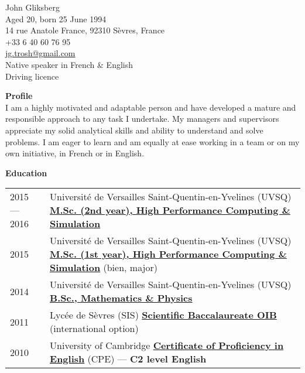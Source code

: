\documentclass[pdftex,a4paper,10pt]{article}
\begin{document}

{\Large John Gliksberg}
\hrulefill\\
\newline
Aged 20, born 25 June 1994\\
14 rue Anatole France, 92310 Sèvres, France\\[.1cm]
+33 6 40 60 76 95\\
\href{mailto:jg.trosh@gmail.com}
{jg.trosh\makeatletter @\makeatother gmail.com}\\[.1cm]
Native speaker in French \& English\\
Driving licence

\begin{center}
\end{center}
\vspace{.3cm}

{\large\bf Profile}
\hrulefill\\[.3cm]
{\setlength{\extrarowheight}{.2cm}
I am a highly motivated and adaptable person and have developed
a mature and responsible approach to any task I undertake.
My managers and supervisors appreciate my solid analytical skills
and ability to understand and solve problems.
I am eager to learn and am equally at ease working in a team
or on my own initiative, in French or in English.
}
\vspace{.3cm}

{\large\bf Education}
\hrulefill\\[.3cm]
{\setlength{\extrarowheight}{.2cm}
\begin{tabularx}{\textwidth}{lX}
2015 \---- 2016 &
Université de Versailles Saint-Quentin-en-Yvelines (UVSQ)
\newline
\href{http://mihps.prism.uvsq.fr}
{\bf M.Sc. (2nd year), High Performance Computing \& Simulation}\\
2015 &
Université de Versailles Saint-Quentin-en-Yvelines (UVSQ)
\newline
\href{http://mihps.prism.uvsq.fr}
{\bf M.Sc. (1st year), High Performance Computing \& Simulation}
(bien, major)\\
2014 &
Université de Versailles Saint-Quentin-en-Yvelines (UVSQ)
\newline
\href{http://www.uvsq.fr/double-licence-mathematiques-et-physique-343617.kjsp}
{\bf B.Sc., Mathematics \& Physics}\\
2011 &
Lycée de Sèvres (SIS)
\newline
\href{http://www.education.gouv.fr/cid20999/l-option-internationale-du-baccalaureat-o.i.b.html}
{\bf Scientific Baccalaureate OIB} (international option)\\
2010 &
University of Cambridge
\newline
\href{http://www.cambridgeenglish.org/exams/proficiency/}
{\bf Certificate of Proficiency in English} (CPE)
\---- {\bf C2 level English}
\end{tabularx}}
\vspace{.4cm}
\end{document}

